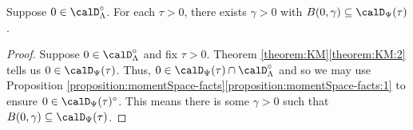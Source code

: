 \begin{corollary}
  \label{corollary:big-time-small-moments}
  Suppose $0 \in \odeSpace^\circ$.
  For each $\tau > 0$, there exists $\gamma > 0$ with $B(0,\gamma) \subseteq \momentSpace(\tau)$.
\end{corollary}
\begin{proof}
  \label{proof:corollary:big-time-small-moments}
  Suppose $0 \in \odeSpace^\circ$ and fix $\tau > 0$.
  Theorem \ref{theorem:KM}\ref{theorem:KM:2} tells us $0 \in \momentSpace(\tau)$. Thus, $0 \in \momentSpace(\tau) \cap \odeSpace^\circ$ and so we may use Proposition \ref{proposition:momentSpace-facts}\ref{proposition:momentSpace-facts:1} to ensure $0 \in \momentSpace(\tau)^\circ$.
  This means there is some $\gamma > 0$ such that $B(0,\gamma) \subseteq \momentSpace(\tau)$.
\end{proof}
